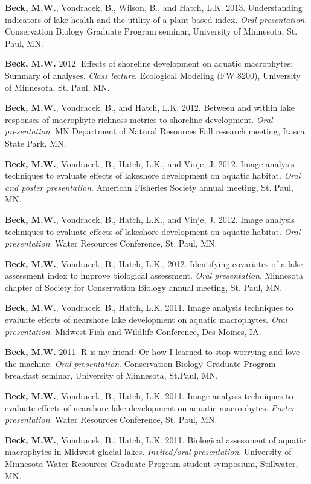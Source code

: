 \documentclass[letterpaper,12pt]{article}
\begin{document}
{\bf Beck, M.W.}, Vondracek, B., Wilson, B., and Hatch, L.K. 2013. Understanding indicators of lake health and the utility of a plant-based index. \textit{Oral presentation}. Conservation Biology Graduate Program seminar, University of Minnesota, St. Paul, MN.

{\bf Beck, M.W.} 2012. Effects of shoreline development on aquatic macrophytes: Summary of analyses. \textit{Class lecture}. Ecological Modeling (FW 8200), University of Minnesota, St. Paul, MN.

{\bf Beck, M.W.}, Vondracek, B., and Hatch, L.K. 2012. Between and within lake responses of macrophyte richness metrics to shoreline development. \textit{Oral presentation}. MN Department of Natural Resources Fall research meeting, Itasca State Park, MN.

{\bf Beck, M.W.}, Vondracek, B., Hatch, L.K., and Vinje, J. 2012. Image analysis techniques to evaluate effects of lakeshore development on aquatic habitat. \textit{Oral and poster presentation}. American Fisheries Society annual meeting, St. Paul, MN.

{\bf Beck, M.W.}, Vondracek, B., Hatch, L.K., and Vinje, J. 2012. Image analysis techniques to evaluate effects of lakeshore development on aquatic habitat. \textit{Oral presentation}. Water Resources Conference, St. Paul, MN.

{\bf Beck, M.W.}, Vondracek, B., Hatch, L.K., 2012. Identifying covariates of a lake assessment index to improve biological assessment. \textit{Oral presentation}. Minnesota chapter of Society for Conservation Biology annual meeting, St. Paul, MN.

{\bf Beck, M.W.}, Vondracek, B., Hatch, L.K. 2011. Image analysis techniques to evaluate effects of nearshore lake development on aquatic macrophytes. \textit{Oral presentation}. Midwest Fish and Wildlife Conference, Des Moines, IA.

{\bf Beck, M.W.} 2011. R is my friend: Or how I learned to stop worrying and love the machine. \textit{Oral presentation}. Conservation Biology Graduate Program breakfast seminar, University of Minnesota, St.Paul, MN.

{\bf Beck, M.W.}, Vondracek, B., Hatch, L.K. 2011. Image analysis techniques to evaluate effects of nearshore lake development on aquatic macrophytes. \textit{Poster presentation}. Water Resources Conference, St. Paul, MN.

{\bf Beck, M.W.}, Vondracek, B., Hatch, L.K. 2011. Biological assessment of aquatic macrophytes in Midwest glacial lakes. \textit{Invited/oral presentation}. University of Minnesota Water Resources Graduate Program student symposium, Stillwater, MN.
\end{document}
